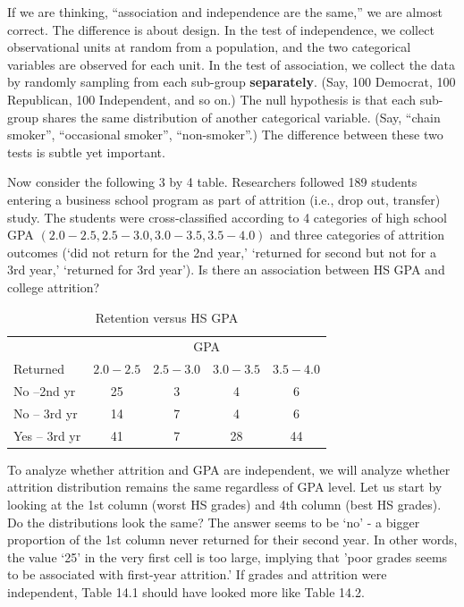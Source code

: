 \documentclass[11pt, chapterprefix=true]{scrbook}\usepackage[]{graphicx}\usepackage[]{color}
\begin{document}
If we are thinking, ``association and independence are the same,''  we are almost correct.  The difference is about design. In the test of independence, we collect observational units at random from a population, and the two categorical variables are observed for each unit. In the test of association, we collect the data by randomly sampling from each sub-group \textbf{separately}. (Say, 100 Democrat, 100 Republican, 100 Independent, and so on.) The null hypothesis is that each sub-group shares the same distribution of another categorical variable. (Say, ``chain smoker'', ``occasional smoker'', ``non-smoker''.)  The difference between these two tests is subtle yet important.

Now consider the following 3 by 4 table.  Researchers followed 189 students entering a business school program as part of attrition (i.e., drop out, transfer) study.  The students were cross-classified according to 4 categories of high school GPA $(2.0-2.5, 2.5-3.0, 3.0-3.5, 3.5-4.0)$ and three categories of attrition outcomes (`did not return for the 2nd year,' `returned for second but not for a 3rd year,' `returned for 3rd year').  Is there an association between HS GPA and college attrition?

\begin{table}[ht]
\centering
\caption{Retention versus HS GPA}
\begin{tabular}{@{} lcccc @{}} \hline
& \multicolumn{4}{c}{GPA} \\
Returned & $2.0-2.5$ & $2.5-3.0$ & $3.0-3.5$ & $3.5-4.0$ \\ \hline
No --2nd yr & 25 & 3 & 4 & 6 \\
No -- 3rd yr & 14 & 7 & 4 & 6 \\
Yes -- 3rd yr & 41 & 7 & 28 & 44 \\ \hline
\end{tabular}
\end{table}

To analyze whether attrition and GPA are independent, we will analyze whether attrition distribution remains the same regardless of GPA level.  Let us start by looking at the 1st column (worst HS grades) and 4th column (best HS grades).  Do the distributions look the same?   The answer seems to be `no' - a bigger proportion of the 1st column never returned for their second year.  In other words, the value `25' in the very first cell is too large, implying that 'poor grades seems to be associated with first-year attrition.'  If grades and attrition were independent, Table 14.1 should have looked more like Table 14.2.
\end{document}
